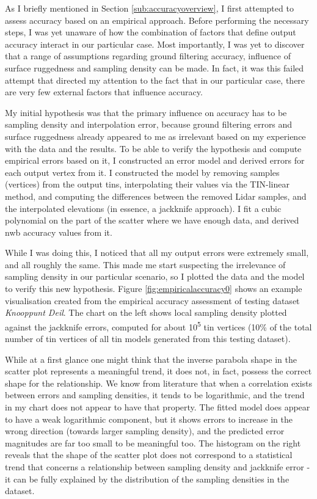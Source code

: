 As I briefly mentioned in Section \ref{sub:accuracyoverview}, I first attempted to assess accuracy based on an empirical approach. Before performing the necessary steps, I was yet unaware of how the combination of factors that define output accuracy interact in our particular case. Most importantly, I was yet to discover that a range of assumptions regarding ground filtering accuracy, influence of surface ruggedness and sampling density can be made. In fact, it was this failed attempt that directed my attention to the fact that in our particular case, there are very few external factors that influence accuracy.

My initial hypothesis was that the primary influence on accuracy has to be sampling density and interpolation error, because ground filtering errors and surface ruggedness already appeared to me as irrelevant based on my experience with the data and the results. To be able to verify the hypothesis and compute empirical errors based on it, I constructed an error model and derived errors for each output vertex from it. I constructed the model by removing samples (vertices) from the output \ac{tin}s, interpolating their values via the TIN-linear method, and computing the differences between the removed Lidar samples, and the interpolated elevations (in essence, a jackknife approach). I fit a cubic polynomial on the part of the scatter where we have enough data, and derived \ac{nwb} accuracy values from it.

While I was doing this, I noticed that all my output errors were extremely small, and all roughly the same. This made me start suspecting the irrelevance of sampling density in our particular scenario, so I plotted the data and the model to verify this new hypothesis. Figure \ref{fig:empiricalaccuracy0} shows an example visualisation created from the empirical accuracy assessment of testing dataset \textit{Knooppunt Deil}. The chart on the left shows local sampling density plotted against the jackknife errors, computed for about 10\textsuperscript{5} \ac{tin} vertices (10\% of the total number of \ac{tin} vertices of all \ac{tin} models generated from this testing dataset).

While at a first glance one might think that the inverse parabola shape in the scatter plot represents a meaningful trend, it does not, in fact, possess the correct shape for the relationship. We know from literature that when a correlation exists between errors and sampling densities, it tends to be logarithmic, and the trend in my chart does not appear to have that property. The fitted model does appear to have a weak logarithmic component, but it shows errors to increase in the wrong direction (towards larger sampling density), and the predicted error magnitudes are far too small to be meaningful too. The histogram on the right reveals that the shape of the scatter plot does not correspond to a statistical trend that concerns a relationship between sampling density and jackknife error - it can be fully explained by the distribution of the sampling densities in the dataset.

